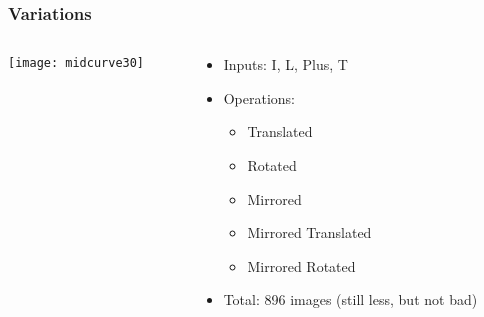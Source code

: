 \begin{frame}[fragile]\frametitle{Variations}

  \begin{columns}
    \begin{column}{0.4\linewidth}
      \centering
      \texttt{[image: midcurve30]}
    \end{column}
    \begin{column}{0.6\linewidth}
	\begin{itemize}
	\item Inputs: I, L, Plus, T
	\item Operations:
	\begin{itemize}
		\item Translated
		\item Rotated
		\item Mirrored
		\item Mirrored Translated
		\item Mirrored Rotated
	\end{itemize}
	\item Total: 896 images (still less, but not bad)
	\end{itemize}
    \end{column}
  \end{columns}
  \end{frame}
  
